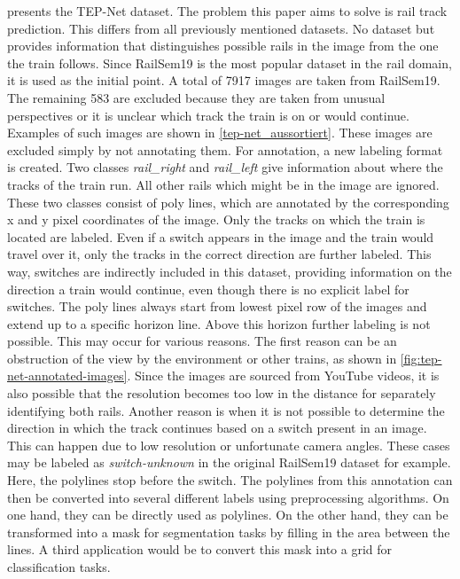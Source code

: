 \cite{tepNet2024} presents the \ac{TEP}-Net dataset.
The problem this paper aims to solve is rail track prediction.
This differs from all previously mentioned datasets.
No dataset but \cite{tepNet2024} provides information that distinguishes possible rails in the image from the one the train follows.
Since RailSem19 is the most popular dataset in the rail domain, it is used as the initial point.
A total of 7917 images are taken from RailSem19.
The remaining 583 are excluded because they are taken from unusual perspectives or it is unclear which track the train is on or would continue.
Examples of such images are shown in \autoref{tep-net_aussortiert}.
These images are excluded simply by not annotating them.
For annotation, a new labeling format is created.
Two classes \textit{rail\_right} and \textit{rail\_left} give information about where the tracks of the train  run.
All other rails which might be in the image are ignored.
These two classes consist of poly lines, which are annotated by the corresponding x and y pixel coordinates of the image.
Only the tracks on which the train is located are labeled.
Even if a switch appears in the image and the train would travel over it, only the tracks in the correct direction are further labeled.
This way, switches are indirectly included in this dataset, providing information on the direction a train would continue, even though there is no explicit label for switches.
The poly lines always start from lowest pixel row of the images and extend up to a specific horizon line.
Above this horizon further labeling is not possible.
This may occur for various reasons.
The first reason can be an obstruction of the view by the environment or other trains, as shown in \autoref{fig:tep-net-annotated-images}.
Since the images are sourced from YouTube videos, it is also possible that the resolution becomes too low in the distance for separately identifying both rails.
Another reason is when it is not possible to determine the direction in which the track continues based on a switch present in an image.
This can happen due to low resolution or unfortunate camera angles.
These cases may be labeled as \textit{switch-unknown} in the original RailSem19 dataset for example.
Here, the polylines stop before the switch.
The polylines from this annotation can then be converted into several different labels using preprocessing algorithms.
On one hand, they can be directly used as polylines.
On the other hand, they can be transformed into a mask for segmentation tasks by filling in the area between the lines.
A third application would be to convert this mask into a grid for classification tasks.

